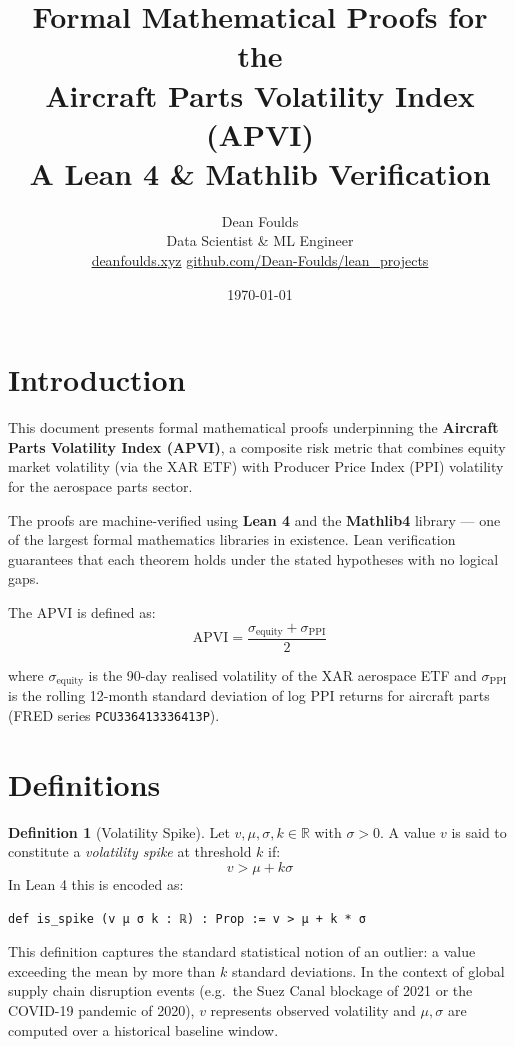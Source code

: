 \documentclass[12pt, a4paper]{article}
\title{
    \vspace{-1cm}
    {\Large\bfseries Formal Mathematical Proofs for the}\\[0.4em]
    {\LARGE\bfseries Aircraft Parts Volatility Index (APVI)}\\[0.6em]
    {\large A Lean 4 \& Mathlib Verification}
}
\author{
    Dean Foulds\\
    \small Data Scientist \& ML Engineer\\
    \small \href{https://deanfoulds.xyz}{deanfoulds.xyz} \quad
    \href{https://github.com/Dean-Foulds/lean_projects}{github.com/Dean-Foulds/lean\_projects}
}
\date{\today}
\theoremstyle{definition}
\newtheorem{definition}[theorem]{Definition}
\begin{document}
\maketitle
\tableofcontents
\newpage

\section{Introduction}

This document presents formal mathematical proofs underpinning the
\textbf{Aircraft Parts Volatility Index (APVI)}, a composite risk metric
that combines equity market volatility (via the XAR ETF) with Producer Price
Index (PPI) volatility for the aerospace parts sector.

The proofs are machine-verified using \textbf{Lean 4} and the
\textbf{Mathlib4} library — one of the largest formal mathematics libraries
in existence. Lean verification guarantees that each theorem holds under
the stated hypotheses with no logical gaps.

The APVI is defined as:
\[
    \text{APVI} = \frac{\sigma_{\text{equity}} + \sigma_{\text{PPI}}}{2}
\]

where $\sigma_{\text{equity}}$ is the 90-day realised volatility of the XAR
aerospace ETF and $\sigma_{\text{PPI}}$ is the rolling 12-month standard
deviation of log PPI returns for aircraft parts (FRED series
\texttt{PCU336413336413P}).

\section{Definitions}

\begin{definition}[Volatility Spike]
Let $v, \mu, \sigma, k \in \mathbb{R}$ with $\sigma > 0$. A value $v$ is
said to constitute a \emph{volatility spike} at threshold $k$ if:
\[
    v > \mu + k\sigma
\]
In Lean 4 this is encoded as:
\begin{lstlisting}
def is_spike (v μ σ k : ℝ) : Prop := v > μ + k * σ
\end{lstlisting}
This definition captures the standard statistical notion of an outlier:
a value exceeding the mean by more than $k$ standard deviations. In the
context of global supply chain disruption events (e.g.\ the Suez Canal
blockage of 2021 or the COVID-19 pandemic of 2020), $v$ represents
observed volatility and $\mu, \sigma$ are computed over a historical
baseline window.
\end{definition}
\end{document}
